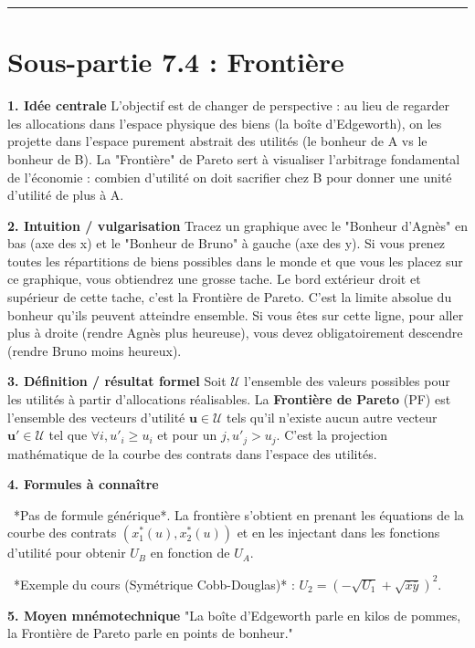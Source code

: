 \documentclass[11pt, a4paper]{report}
\begin{document}
\vspace{1cm}\hrule\vspace{1cm}

\section{Sous-partie 7.4 : Frontière}

\textbf{1. Idée centrale}
L'objectif est de changer de perspective : au lieu de regarder les allocations dans l'espace physique des biens (la boîte d'Edgeworth), on les projette dans l'espace purement abstrait des utilités (le bonheur de A vs le bonheur de B). La "Frontière" de Pareto sert à visualiser l'arbitrage fondamental de l'économie : combien d'utilité on doit sacrifier chez B pour donner une unité d'utilité de plus à A.

\textbf{2. Intuition / vulgarisation}
Tracez un graphique avec le "Bonheur d'Agnès" en bas (axe des x) et le "Bonheur de Bruno" à gauche (axe des y). Si vous prenez toutes les répartitions de biens possibles dans le monde et que vous les placez sur ce graphique, vous obtiendrez une grosse tache. Le bord extérieur droit et supérieur de cette tache, c'est la Frontière de Pareto. C'est la limite absolue du bonheur qu'ils peuvent atteindre ensemble. Si vous êtes sur cette ligne, pour aller plus à droite (rendre Agnès plus heureuse), vous devez obligatoirement descendre (rendre Bruno moins heureux).

\textbf{3. Définition / résultat formel}
Soit $\mathcal{U}$ l'ensemble des valeurs possibles pour les utilités à partir d'allocations réalisables.
La \textbf{Frontière de Pareto} (PF) est l'ensemble des vecteurs d'utilité $\mathbf{u} \in \mathcal{U}$ tels qu'il n'existe aucun autre vecteur $\mathbf{u}' \in \mathcal{U}$ tel que $\forall i, u'_i \ge u_i$ et pour un $j, u'_j > u_j$.
C'est la projection mathématique de la courbe des contrats dans l'espace des utilités.

\textbf{4. Formules à connaître}
\par \textbullet\ *Pas de formule générique*. La frontière s'obtient en prenant les équations de la courbe des contrats $(x_1^*(u), x_2^*(u))$ et en les injectant dans les fonctions d'utilité pour obtenir $U_B$ en fonction de $U_A$.
\par \textbullet\ *Exemple du cours (Symétrique Cobb-Douglas)* : $U_2 = \left(-\sqrt{U_1} + \sqrt{\bar{x}\bar{y}}\right)^2$.

\textbf{5. Moyen mnémotechnique}
"La boîte d'Edgeworth parle en kilos de pommes, la Frontière de Pareto parle en points de bonheur."
\end{document}
